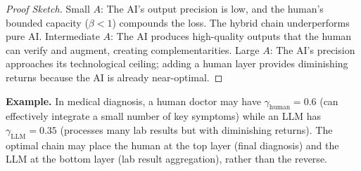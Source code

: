 \begin{proof}[Proof Sketch]
Small $A$: The AI's output precision is low, and the human's bounded capacity ($\beta < 1$) compounds the loss. The hybrid chain underperforms pure AI. Intermediate $A$: The AI produces high-quality outputs that the human can verify and augment, creating complementarities. Large $A$: The AI's precision approaches its technological ceiling; adding a human layer provides diminishing returns because the AI is already near-optimal.
\end{proof}

\textbf{Example.} In medical diagnosis, a human doctor may have $\gamma_{\text{human}} = 0.6$ (can effectively integrate a small number of key symptoms) while an LLM has $\gamma_{\text{LLM}} = 0.35$ (processes many lab results but with diminishing returns). The optimal chain may place the human at the top layer (final diagnosis) and the LLM at the bottom layer (lab result aggregation), rather than the reverse.
